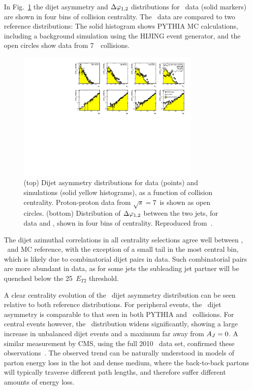 In Fig.~\ref{fig:GR:final_4x2} the dijet asymmetry and $\Delta\varphi_{1,2}$ distributions 
for \PbPb\ data (solid markers) are shown in four bins of collision centrality. 
The \PbPb\ data are compared to two reference distributions: The solid histogram shows 
PYTHIA MC calculations, including a background simulation using the HIJING event generator,
and the open circles show data from 7\TeV\ \pp\ collisions. 
\begin{figure}[!thb]
\begin{center}
\includegraphics[width=0.8\textwidth]{jetfigures/final_4x2_23_newpp.pdf}
\caption{
(top) Dijet asymmetry distributions for data (points) and {} 
simulations (solid yellow histograms), as a function of collision centrality.  
Proton-proton data from $\sqrt{s}=7$\TeV\ is shown as open circles.
(bottom) Distribution of $\Delta\varphi_{1,2}$ between the two jets, 
for data and {}, shown in four bins of centrality.
Reproduced from~\cite{Aad:2010bu}.}
\label{fig:GR:final_4x2}
\end{center}
\end{figure}

The dijet azimuthal correlations in all centrality selections agree well between \PbPb, 
\pp\ and MC reference, with the exception of a small tail in the most central bin, 
which is likely due to combinatorial dijet pairs in data. Such combinatorial pairs
are more abundant in data, as for some jets the subleading jet partner will be quenched 
below the 25\GeVc\ $E_{T2}$ threshold.

A clear centrality evolution of the \PbPb\ dijet asymmetry distribution can be seen relative
to both reference distributions.  For peripheral events, the \PbPb\ dijet asymmetry
is comparable to that seen in both PYTHIA and \pp\ collisions. For central events however,
the \AJ\ distribution widens significantly, showing a large increase in unbalanced
dijet events and a maximum far away from $A_J =  0$. 
A similar measurement by CMS, using the full 2010 \PbPb\ data set, confirmed these 
observations~\cite{Chatrchyan:2011sx}.
The observed trend can be naturally understood in models of parton energy
loss in the hot and dense medium, where the back-to-back partons will typically traverse
different path lengths, and therefore suffer different amounts of energy loss. 

